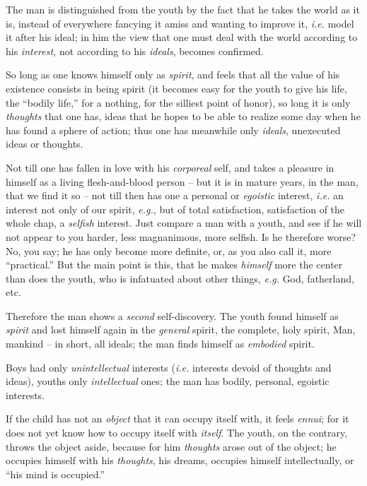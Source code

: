 \documentclass[12pt,a4paper]{book}
\begin{document}
The man is distinguished from the youth by the fact that he takes the world as 
it is, instead of everywhere fancying it amiss and wanting to improve it, 
\textit{i.e.} model it after his ideal; in him the view that one must deal 
with the world according to his \textit{interest,} not according to his 
\textit{ideals}, becomes confirmed.

So long as one knows himself only as \textit{spirit}, and feels that all the 
value of his existence consists in being spirit (it becomes easy for the youth 
to give his life, the ``bodily life,'' for a nothing, for the silliest point 
of honor), so long it is only \textit{thoughts} that one has, ideas that he 
hopes to be able to realize some day when he has found a sphere of action; 
thus one has meanwhile only \textit{ideals}, unexecuted ideas or thoughts.

Not till one has fallen in love with his \textit{corporeal} self, and takes a 
pleasure in himself as a living flesh-and-blood person -- but it is in mature 
years, in the man, that we find it so -- not till then has one a personal or 
\textit{egoistic} interest, \textit{i.e.} an interest not only of our spirit, 
\textit{e.g.}, but of total satisfaction, satisfaction of the whole chap, a 
\textit{selfish} interest. Just compare a man with a youth, and see if he will 
not appear to you harder, less magnanimous, more selfish. Is he therefore 
worse? No, you say; he has only become more definite, or, as you also call it, 
more ``practical.'' But the main point is this, that he makes 
\textit{himself} more the center than does the youth, who is infatuated about 
other things, \textit{e.g.} God, fatherland, etc.

Therefore the man shows a \textit{second} self-discovery. The youth found 
himself as \textit{spirit} and lost himself again in the \textit{general} 
spirit, the complete, holy spirit, Man, mankind -- in short, all ideals; the 
man finds himself as \textit{embodied} spirit.

Boys had only \textit{unintellectual} interests (\textit{i.e.} interests 
devoid of thoughts and ideas), youths only \textit{intellectual} ones; the man 
has bodily, personal, egoistic interests.

If the child has not an \textit{object} that it can occupy itself with, it 
feels \textit{ennui}; for it does not yet know how to occupy itself with 
\textit{itself}. The youth, on the contrary, throws the object aside, because 
for him \textit{thoughts} arose out of the object; he occupies himself with 
his \textit{thoughts}, his dreams, occupies himself intellectually, or ``his 
mind is occupied.''
\end{document}
